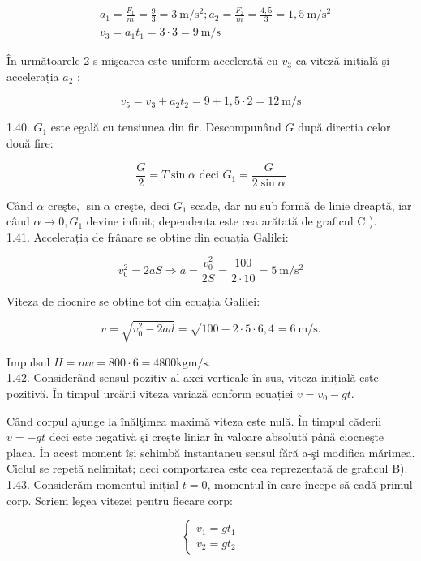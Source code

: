 $$
\begin{aligned}
& a_{1}=\frac{F_{1}}{m}=\frac{9}{3}=3 \mathrm{~m} / \mathrm{s}^{2} ; a_{2}=\frac{F_{2}}{m}=\frac{4,5}{3}=1,5 \mathrm{~m} / \mathrm{s}^{2} \\
& v_{3}=a_{1} t_{1}=3 \cdot 3=9 \mathrm{~m} / \mathrm{s}
\end{aligned}
$$

În următoarele 2 s mişcarea este uniform accelerată cu $v_{3}$ ca viteză inițială şi accelerația $a_{2}$ :

$$
v_{5}=v_{3}+a_{2} t_{2}=9+1,5 \cdot 2=12 \mathrm{~m} / \mathrm{s}
$$

1.40. $G_{1}$ este egală cu tensiunea din fir. Descompunând $G$ după directia celor două fire:

$$
\frac{G}{2}=T \sin \alpha \text { deci } G_{1}=\frac{G}{2 \sin \alpha}
$$

Când $\alpha$ creşte, $\sin \alpha$ creşte, deci $G_{1}$ scade, dar nu sub formă de linie dreaptă, iar când $\alpha \rightarrow 0, G_{1}$ devine infinit; dependența este cea arătată de graficul C ).\\
1.41. Accelerația de frânare se obține din ecuația Galilei:

$$
v_{0}^{2}=2 a S \Rightarrow a=\frac{v_{0}^{2}}{2 S}=\frac{100}{2 \cdot 10}=5 \mathrm{~m} / \mathrm{s}^{2}
$$

Viteza de ciocnire se obține tot din ecuația Galilei:

$$
v=\sqrt{v_{0}^{2}-2 a d}=\sqrt{100-2 \cdot 5 \cdot 6,4}=6 \mathrm{~m} / \mathrm{s} .
$$

Impulsul $H=m v=800 \cdot 6=4800 \mathrm{kgm} / \mathrm{s}$.\\
1.42. Considerând sensul pozitiv al axei verticale în sus, viteza inițială este pozitivă. În timpul urcării viteza variază conform ecuației $v=v_{0}-g t$.

Când corpul ajunge la înălţimea maximă viteza este nulă. În timpul căderii $v=-g t$ deci este negativă şi creşte liniar în valoare absolută până ciocneşte placa. În acest moment își schimbă instantaneu sensul fără a-şi modifica mǎrimea. Ciclul se repetă nelimitat; deci comportarea este cea reprezentată de graficul B).\\
1.43. Considerăm momentul inițial $t=0$, momentul în care începe să cadă primul corp. Scriem legea vitezei pentru fiecare corp:

$$
\left\{\begin{array}{l}
v_{1}=g t_{1} \\
v_{2}=g t_{2}
\end{array}\right.
$$

